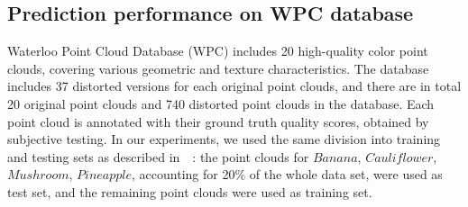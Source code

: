 \documentclass[conference]{IEEEtran}
\begin{document}
\begin{table}[t]
\begin{center}
\caption{Ablation study of the COPP-Net model on the WPC database. AVE stands for average pooling, and CORA stands for correlation weight pooling strategy.}
\label{tab:ablation}
\end{center}
\end{table}











\subsection{Prediction performance on WPC database}
Waterloo Point Cloud Database (WPC) includes 20 high-quality color point clouds, covering various geometric and texture characteristics. The database includes 37 distorted versions for each original point clouds, and there are in total 20 original point clouds and 740 distorted point clouds in the database. Each point cloud is annotated with their ground truth quality scores, obtained by subjective testing. In our experiments, we used the same division into training and testing sets as described in~\cite{liu2021pqa}~\cite{zhang2022no}: the point clouds for $Banana$, $Cauliflower$, $Mushroom$, $Pineapple$, accounting for 20\% of the whole data set, were used as test set, and the remaining point clouds were used as training set.
\end{document}
